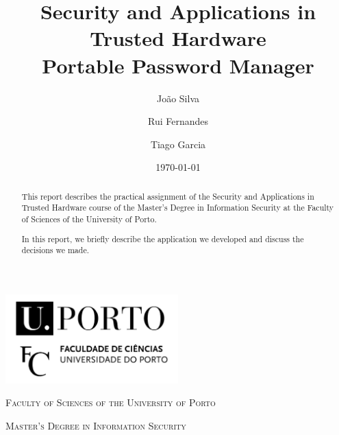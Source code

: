 \documentclass[a4paper, 11pt]{article}
\title{Security and Applications in Trusted Hardware \\ [.8em] \smaller Portable Password Manager}
\author{João Silva \and Rui Fernandes \and Tiago Garcia}
\date{\today}
\begin{document}
    \begin{titlepage}
        \begin{center}
            \begin{minipage}{.75\linewidth}
                \centering
                \includegraphics[width=0.5\textwidth]{img/fcup}\par\vspace{1cm}
                \vspace{1.5cm}
                {\scshape\LARGE Faculty of Sciences of the University of Porto} \par
                \vspace{1cm}
                {\scshape\Large Master's Degree in Information Security} \par
                \vspace{1.5cm}
                \maketitle
            \end{minipage}
        \end{center}
        \vspace{2cm}
        \thispagestyle{empty}
        \pagebreak
    \end{titlepage}


    \begin{abstract}
        This report describes the practical assignment of the Security and Applications in Trusted Hardware
        course of the Master's Degree in Information Security at the Faculty of Sciences of the University
        of Porto.

        In this report, we briefly describe the application we developed and discuss the decisions we made.
    \end{abstract}

    \pagebreak

    \tableofcontents
    \listoffigures

    \pagebreak

\end{document}
